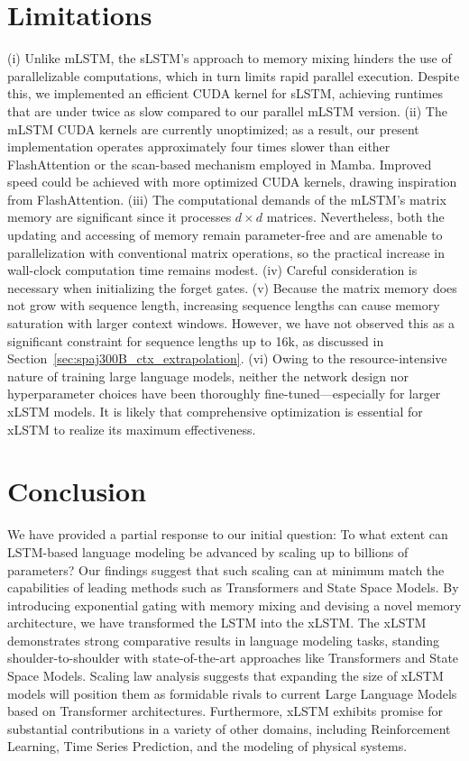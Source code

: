 \section{Limitations}

(i) Unlike mLSTM, the sLSTM’s approach to memory mixing hinders the use of parallelizable computations, which in turn limits rapid parallel execution. Despite this, we implemented an efficient CUDA kernel for sLSTM, achieving runtimes that are under twice as slow compared to our parallel mLSTM version. (ii) The mLSTM CUDA kernels are currently unoptimized; as a result, our present implementation operates approximately four times slower than either FlashAttention or the scan-based mechanism employed in Mamba. Improved speed could be achieved with more optimized CUDA kernels, drawing inspiration from FlashAttention. (iii) The computational demands of the mLSTM’s matrix memory are significant since it processes $d \times d$ matrices. Nevertheless, both the updating and accessing of memory remain parameter-free and are amenable to parallelization with conventional matrix operations, so the practical increase in wall-clock computation time remains modest. (iv) Careful consideration is necessary when initializing the forget gates. (v) Because the matrix memory does not grow with sequence length, increasing sequence lengths can cause memory saturation with larger context windows. However, we have not observed this as a significant constraint for sequence lengths up to 16k, as discussed in Section~\ref{sec:spaj300B_ctx_extrapolation}. (vi) Owing to the resource-intensive nature of training large language models, neither the network design nor hyperparameter choices have been thoroughly fine-tuned—especially for larger xLSTM models. It is likely that comprehensive optimization is essential for xLSTM to realize its maximum effectiveness.

\section{Conclusion}
We have provided a partial response to our initial question: To what extent can LSTM-based language modeling be advanced by scaling up to billions of parameters? Our findings suggest that such scaling can at minimum match the capabilities of leading methods such as Transformers and State Space Models. By introducing exponential gating with memory mixing and devising a novel memory architecture, we have transformed the LSTM into the xLSTM. The xLSTM demonstrates strong comparative results in language modeling tasks, standing shoulder-to-shoulder with state-of-the-art approaches like Transformers and State Space Models. Scaling law analysis suggests that expanding the size of xLSTM models will position them as formidable rivals to current Large Language Models based on Transformer architectures. Furthermore, xLSTM exhibits promise for substantial contributions in a variety of other domains, including Reinforcement Learning, Time Series Prediction, and the modeling of physical systems.

